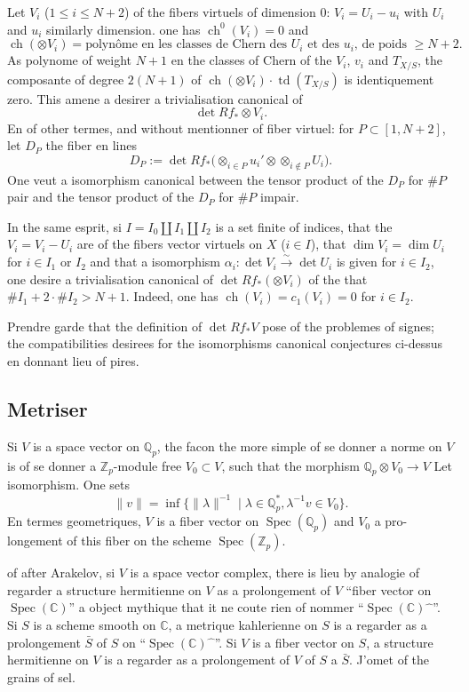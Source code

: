 \documentclass[12pt,a4paper]{article}
\theoremstyle{plain}
\theoremstyle{definition}
\DeclareMathOperator{\ch}{ch}
\DeclareMathOperator{\td}{td}
\DeclareMathOperator{\Spec}{Spec}
\newcommand{\ZZ}{\mathbb{Z}}
\newcommand{\QQ}{\mathbb{Q}}
\newcommand{\CC}{\mathbb{C}}
\begin{document}
Let $V_i$ ($1 \leq i \leq N+2$) of the fibers virtuels of dimension 0: $V_i =
U_i - u_i$ with $U_i$ and $u_i$ similarly dimension. one has $\ch^0(V_i) = 0$ and
\[
\ch(\otimes V_i) = \text{polyn\^ome en les classes de Chern des $U_i$ et des $u_i$, de poids } \geq N+2 .
\]
As polynome of weight $N+1$ en the classes of Chern of the $V_i$, $v_i$ and $T_{X/S}$,
the composante of degree $2(N+1)$ of $\ch(\otimes V_i) \cdot \td(T_{X/S})$ is identiquement zero.
This amene a desirer a trivialisation canonical of
\[
\det Rf_* \otimes V_i .
\]
En of other termes, and without mentionner of fiber virtuel: for $P \subset [1, N+2]$,
let $D_P$ the fiber en lines
\[
D_P := \det Rf_* \bigl(\otimes_{i \in P} u_i' \otimes \otimes_{i \notin P} U_i\bigr) .
\]
One veut a isomorphism canonical between the tensor product of the $D_P$ for $\#P$
pair and the tensor product of the $D_P$ for $\#P$ impair.

In the same esprit, si $I = I_0 \amalg I_1 \amalg I_2$ is a set finite of indices,
that the $V_i = V_i - U_i$ are of the fibers vector virtuels on $X$ ($i \in I$), that
$\dim V_i = \dim U_i$ for $i \in I_1$ or $I_2$ and that a isomorphism $\alpha_i: \det V_i \xrightarrow{\sim}
\det U_i$ is given for $i \in I_2$, one desire a trivialisation canonical of
$\det Rf_* (\otimes V_i)$ of the that $\#I_1 + 2 \cdot \#I_2 > N+1$. Indeed, one has $\ch(V_i) = c_1(V_i)
= 0$ for $i \in I_2$.

Prendre garde that the definition of $\det Rf_* V$ pose of the problemes of signes;
the compatibilities desirees for the isomorphisms canonical conjectures ci-dessus
en donnant lieu of pires.

\subsection{Metriser}

Si $V$ is a space vector on $\QQ_p$, the facon the more simple of se donner
a norme on $V$ is of se donner a $\ZZ_p$-module free $V_0 \subset V$, such that the morphism
$\QQ_p \otimes V_0 \to V$ Let isomorphism. One sets
\[
\|v\| = \inf \{\|\lambda\|^{-1} \mid \lambda \in \QQ_p^*, \lambda^{-1} v \in V_0\} .
\]
En termes geometriques, $V$ is a fiber vector on $\Spec(\QQ_p)$ and $V_0$ a pro-
longement of this fiber on the scheme $\Spec(\ZZ_p)$.

of after Arakelov, si $V$ is a space vector complex, there is lieu by
analogie of regarder a structure hermitienne on $V$ as a prolongement of
$V$ ``fiber vector on $\Spec(\CC)$'' a object mythique that it ne coute rien of nommer
``$\Spec(\CC)\widehat{\phantom{x}}$''. Si $S$ is a scheme smooth on $\CC$, a metrique kahlerienne on
$S$ is a regarder as a prolongement $\bar{S}$ of $S$ on ``$\Spec(\CC)\widehat{\phantom{x}}$''. Si $V$
is a fiber vector on $S$, a structure hermitienne on $V$ is a regarder
as a prolongement of $V$ of $S$ a $\bar{S}$. J'omet of the grains of sel.
\end{document}
